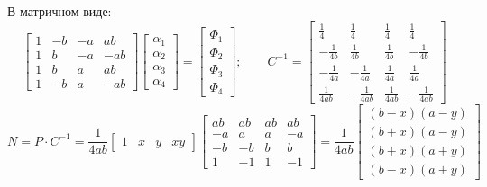		В матричном виде:
		\[
		\begin{bmatrix}
			1 & -b & -a & ab \\
			1 & b & -a &-ab \\
			1 & b & a & ab \\
			1 & -b & a & -ab
		\end{bmatrix}
		\begin{bmatrix}
			\alpha_1 \\ \alpha_2 \\ \alpha_3 \\ \alpha_4 
		\end{bmatrix} = \begin{bmatrix}
		\Phi_1 \\ \Phi_2 \\ \Phi_3 \\ \Phi_4  		
		\end{bmatrix}; \qquad C^{-1}= \begin{bmatrix}
		\frac{1}{4} & \frac{1}{4} & \frac{1}{4} & \frac{1}{4} \\
		-\frac{1}{4b} & \frac{1}{4b} & \frac{1}{4b} & -\frac{1}{4b} \\
		-\frac{1}{4a} & -\frac{1}{4a} & \frac{1}{4a} & \frac{1}{4a} \\
		\frac{1}{4ab} & -\frac{1}{4ab} & \frac{1}{4ab} & -\frac{1}{4ab} 
		\end{bmatrix}
		\]
		\[
	N = P\cdot C^{-1} = \frac{1}{4ab}\begin{bmatrix}
		1 & x & y & xy 
	\end{bmatrix} \begin{bmatrix}
	ab & ab & ab & ab \\
	-a & a & a & -a \\
	-b & -b & b & b \\
	1 & -1 & 1 & -1
	\end{bmatrix} =  \frac{1}{4ab} \begin{bmatrix}
	(b-x)(a-y) \\ (b+x)(a-y) \\ (b+x)(a+y) \\ (b-x)(a+y)
	\end{bmatrix}
		\]
		
